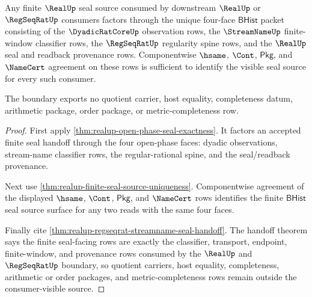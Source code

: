 \begin{theorem}
\label{thm:realup-seal-source-factorization-boundary}
Any finite $\RealUp$ seal source consumed by downstream $\RealUp$ or
$\RegSeqRatUp$ consumers factors through the unique four-face
$\mathsf{BHist}$ packet consisting of the $\DyadicRatCoreUp$ observation rows,
the $\StreamNameUp$ finite-window classifier rows, the $\RegSeqRatUp$
regularity spine rows, and the $\RealUp$ seal and readback provenance rows.
Componentwise $\hsame$, $\Cont$, $\mathsf{Pkg}$, and $\NameCert$ agreement on
these rows is sufficient to identify the visible seal source for every such
consumer.

The boundary exports no quotient carrier, host equality, completeness datum,
arithmetic package, order package, or metric-completeness row.
\end{theorem}
\begin{proof}
First apply \autoref{thm:realup-open-phase-seal-exactness}. It factors an
accepted finite seal handoff through the four open-phase faces: dyadic
observations, stream-name classifier rows, the regular-rational spine, and the
seal/readback provenance.

Next use \autoref{thm:realup-finite-seal-source-uniqueness}. Componentwise
agreement of the displayed $\hsame$, $\Cont$, $\mathsf{Pkg}$, and $\NameCert$
rows identifies the finite $\mathsf{BHist}$ seal source surface for any two
reads with the same four faces.

Finally cite \autoref{thm:realup-regseqrat-streamname-seal-handoff}. The
handoff theorem says the finite seal-facing rows are exactly the classifier,
transport, endpoint, finite-window, and provenance rows consumed by the
$\RealUp$ and $\RegSeqRatUp$ boundary, so quotient carriers, host equality,
completeness, arithmetic or order packages, and metric-completeness rows remain
outside the consumer-visible source.
\end{proof}

